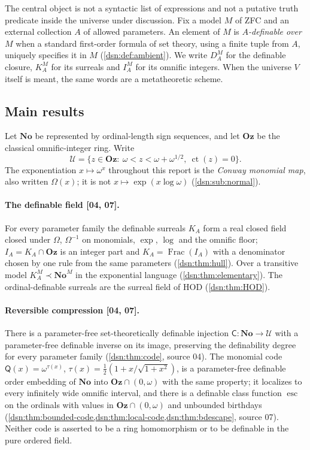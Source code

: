 \documentclass[11pt,a4paper]{article}
\numberwithin{equation}{section}
\theoremstyle{definition}
\theoremstyle{remark}
\newcommand{\No}{\mathbf{No}}
\newcommand{\Oz}{\mathbf{Oz}}
\newcommand{\HOD}{\mathrm{HOD}}
\newcommand{\ct}{\operatorname{ct}}
\newcommand{\Frac}{\operatorname{Frac}}
\newcommand{\Code}{\mathsf C}
\newcommand{\Mc}{\mathsf Q}
\newcommand{\esc}{\operatorname{esc}}
\newcommand{\Cell}{\mathcal U}
\newcommand{\src}[1]{\textup{\textsf{\small[#1]}}}
\begin{document}
The central object is not a syntactic list of expressions and not a
putative truth predicate inside the universe under discussion. Fix a model
$M$ of ZFC and an external collection $A$ of allowed parameters. An element
of $M$ is \emph{$A$-definable over $M$} when a standard first-order formula
of set theory, using a finite tuple from $A$, uniquely specifies it in $M$
(\cref{dsn:def:ambient}). We write $D^M_A$ for the definable closure,
$K^M_A$ for its surreals and $I^M_A$ for its omnific integers. When the
universe $V$ itself is meant, the same words are a metatheoretic scheme.

\subsection{Main results}\label{dsn:sub:main}

Let $\No$ be represented by ordinal-length sign sequences, and let $\Oz$
be the classical omnific-integer ring. Write
\begin{equation}\label{dsn:eq:maincell}
 \Cell=\{z\in\Oz:\ \omega<z<\omega+\omega^{1/2},\ \ct(z)=0\}.
\end{equation}
The exponentiation $x\mapsto\omega^x$ throughout this report is the
\emph{Conway monomial map}, also written $\Omega(x)$; it is not
$x\mapsto\exp(x\log\omega)$ (\cref{dsn:sub:normal}).

\paragraph{The definable field \src{04, 07}.}
For every parameter family the definable surreals $K_A$ form a real closed
field closed under $\Omega$, $\Omega^{-1}$ on monomials, $\exp$, $\log$
and the omnific floor; $I_A=K_A\cap\Oz$ is an integer part and
$K_A=\Frac(I_A)$ with a denominator chosen by one rule from the same
parameters (\cref{dsn:thm:hull}). Over a transitive model
$K^M_A\prec\No^M$ in the exponential language (\cref{dsn:thm:elementary}).
The ordinal-definable surreals are the surreal field of $\HOD$
(\cref{dsn:thm:HOD}).

\paragraph{Reversible compression \src{04, 07}.}
There is a parameter-free set-theoretically definable injection
$\Code:\No\to\Cell$ with a parameter-free definable inverse on its image,
preserving the definability degree for every parameter family
(\cref{dsn:thm:code}, source 04). The monomial code
$\Mc(x)=\omega^{\tau(x)}$, $\tau(x)=\frac12(1+x/\sqrt{1+x^2})$, is a
parameter-free definable order embedding of $\No$ into
$\Oz\cap(0,\omega)$ with the same property; it localizes to every
infinitely wide omnific interval, and there is a definable class function
$\esc$ on the ordinals with values in $\Oz\cap(0,\omega)$ and unbounded
birthdays (\cref{dsn:thm:bounded-code,dsn:thm:local-code,dsn:thm:bdescape},
source 07). Neither code is asserted to be a ring homomorphism or to be
definable in the pure ordered field.
\end{document}
